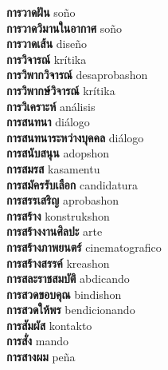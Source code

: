 \textbf{ การวาดฝัน  } soño \\
\textbf{ การวาดวิมานในอากาศ  } soño \\
\textbf{ การวาดเส้น  } diseño \\
\textbf{ การวิจารณ์  } krítika \\
\textbf{ การวิพากวิจารณ์  } desaprobashon \\
\textbf{ การวิพากษ์วิจารณ์  } krítika \\
\textbf{ การวิเคราะห์  } análisis \\
\textbf{ การสนทนา  } diálogo \\
\textbf{ การสนทนาระหว่างบุคคล  } diálogo \\
\textbf{ การสนับสนุน  } adopshon \\
\textbf{ การสมรส  } kasamentu \\
\textbf{ การสมัครรับเลือก  } candidatura \\
\textbf{ การสรรเสริญ  } aprobashon \\
\textbf{ การสร้าง  } konstrukshon \\
\textbf{ การสร้างงานศิลปะ  } arte \\
\textbf{ การสร้างภาพยนตร์  } cinematografico \\
\textbf{ การสร้างสรรค์  } kreashon \\
\textbf{ การสละราชสมบัติ  } abdicando \\
\textbf{ การสวดขอบคุณ  } bindishon \\
\textbf{ การสวดให้พร  } bendicionando \\
\textbf{ การสัมผัส  } kontakto \\
\textbf{ การสั่ง  } mando \\
\textbf{ การสางผม  } peña \\
